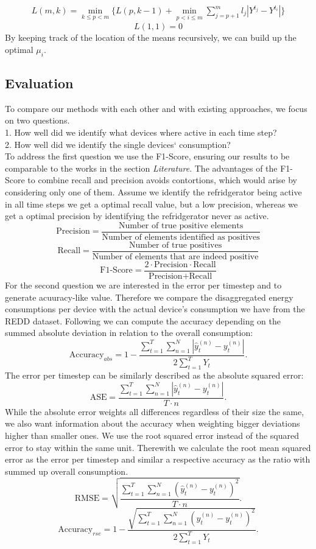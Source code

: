 \documentclass{article}
\begin{document}
%
\begin{align*}
    L(m,k) = \min_{k \leq p < m} \bigg\{ L(p,k-1) + \min_{p < i \leq m} \sum_{j = p+1}^m l_j |Y^{t_j} - Y^{t_i}| \bigg\}
\end{align*}
%
\[ L(1,1) = 0 \]
%
By keeping track of the location of the means recursively, we can build up the optimal $\mu_i$.

\subsection{Evaluation}
To compare our methods with each other and with existing approaches, we focus on two questions.\\
1. How well did we identify what devices where active in each time step?\\
2. How well did we identify the single devices‘ consumption?\\
To address the first question we use the F1-Score, ensuring our results to be comparable to the works in the section \textit{Literature}. The 
advantages of the F1-Score to combine recall and precision avoids contortions, which would arise by considering only one of them. Assume we 
identify the refridgerator being active in all time steps we get a optimal recall value, but a low precision, whereas we get a optimal precision 
by identifying the refridgerator never as active.
\[ \textrm{Precision} = \frac{\textrm{Number of true positive elements}}{\textrm{Number of elements identified as positives}}  \]
\[ \textrm{Recall} = \frac{\textrm{Number of true positives}}{\textrm{Number of elements that are indeed positive}}  \]
\[ \textrm{F1-Score} = \frac{2 \cdot \textrm{Precision} \cdot \textrm{Recall}}{\textrm{Precision} + \textrm{Recall}}\]
For the second question we are interested in the error per timestep and to generate acuuracy-like value. Therefore we
compare the disaggregated energy consumptions per device with the actual device's consumption we have from the REDD
dataset. Following \cite{Redd} we can compute the accuracy depending on the summed absolute deviation in relation to 
the overall consumption:
\[\textrm{Accuracy}_{abs} = 1- \frac{\sum^{T}_{t=1}\sum^{N}_{n=1}|\hat{y}^{(n)}_t-y^{(n)}_t|}{2 \sum^{T}_{t=1}Y_t} .  \]
The error per timestep can be similarly described as the absolute squared error:
\[\textrm{ASE} = \frac{\sum^{T}_{t=1}\sum^{N}_{n=1}|\hat{y}^{(n)}_t-y^{(n)}_t|}{T \cdot n} .  \]
While the absolute error weights all differences regardless of their size the same, we also want information about the accuracy when 
weighting bigger deviations higher than smaller ones. We use the root squared error instead of the squared error 
to stay within the same unit. Therewith we calculate the root mean squared error as the error per timestep and similar a respective 
accuracy as the ratio with summed up overall consumption.
\[\textrm{RMSE} = \sqrt{\frac{\sum^{T}_{t=1}\sum^{N}_{n=1}(\hat{y}^{(n)}_t-y^{(n)}_t)^2}{T \cdot n}} .  \]
\[\textrm{Accuracy}_{rse} = 1- \frac{\sqrt{\sum^{T}_{t=1}\sum^{N}_{n=1}(\hat{y}^{(n)}_t-y^{(n)}_t)^2}}{2 \sum^{T}_{t=1}Y_t} .  \]
\end{document}
